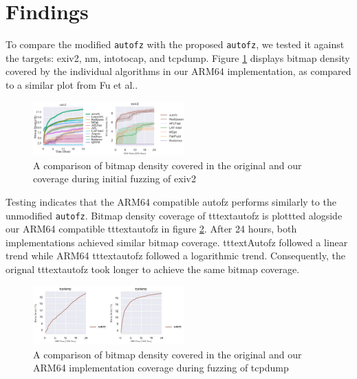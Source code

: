 \section{Findings}

To compare the  modified \texttt{autofz} with the proposed \texttt{autofz}, we tested it against the 
targets: exiv2, nm, intotocap, and tcpdump. Figure \ref{fig:exiv2_compare_orig_arm64} 
displays bitmap density covered by the individual algorithms in our ARM64 implementation, 
as compared to a similar plot from Fu et al.\cite{fu_autofz_2023}. 

\begin{figure}
    \includegraphics[width=0.52\textwidth]{figs/exiv2_compare_orig_arm64.png}
    \centering
    \caption{A comparison of bitmap density covered in the original\cite{fu_autofz_2023} and our 
    coverage during initial fuzzing of exiv2}
    \label{fig:exiv2_compare_orig_arm64}
\end{figure}

Testing indicates that the ARM64 compatible autofz performs similarly to the unmodified \texttt{autofz}. 
Bitmap density coverage of tttext{autofz} is plottted alogside our ARM64 compatible tttext{autofz} in figure 
\ref{fig:tcpdump_compare_orig_arm64}. After 24 hours, both implementations achieved similar bitmap coverage.
tttext{Autofz} followed a linear trend while ARM64 tttext{autofz} followed a logarithmic trend. Consequently, 
the orignal tttext{autofz} took longer to achieve the same bitmap coverage. 

\begin{figure}
    \includegraphics[width=0.52\textwidth]{figs/tcpdump_compare_orig_arm64.png}
    \centering
    \caption{A comparison of bitmap density covered in the original\cite{fu_autofz_2023} and our ARM64 implementation
    coverage during fuzzing of tcpdump}
    \label{fig:tcpdump_compare_orig_arm64}
\end{figure}

